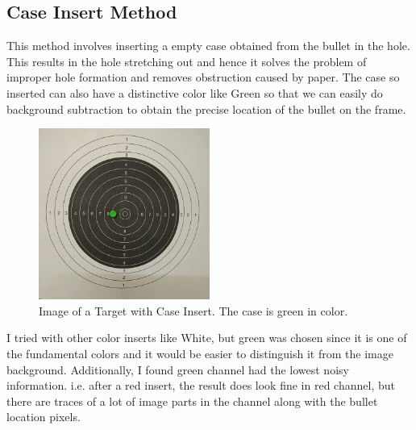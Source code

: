 \documentclass[10pt,twocolumn,letterpaper]{article}
\begin{document}
\subsection{Case Insert Method}
This method involves inserting a empty case obtained from the bullet in the hole.
This results in the hole stretching out and hence it solves the problem of improper hole formation and removes obstruction caused by paper. The case so inserted can also have a distinctive color like Green so that we can easily do background subtraction to obtain the precise location of the bullet on the frame.
\begin{figure}[h]
	\centering
	\includegraphics[width=0.5\textwidth]{CaseInsertImage}
	\caption{Image of a Target with Case Insert. The case is green in color.}
	\label{CaseInsertImage}
\end{figure}
I tried with other color inserts like White, but green was chosen since it is one of the fundamental colors and it would be easier to distinguish it from the image background. Additionally, I found green channel had the lowest noisy information. i.e. after a red insert, the result does look fine in red channel, but there are traces of a lot of image parts in the channel along with the bullet location pixels.
\end{document}
